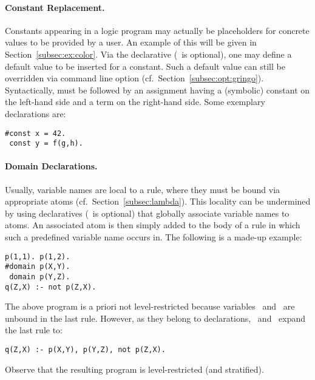 \paragraph{Constant Replacement.}
Constants appearing in a logic program may actually be placeholders for
concrete values to be provided by a user.
An example of this will be given in Section~\ref{subsec:ex:color}.
Via the  declarative (\code{\#}~is optional),
one may define a default value to be inserted for a constant.
Such a default value can still be overridden via command line option
 (cf.\ Section~\ref{subsec:opt:gringo}).
Syntactically,  must be followed by an assignment having
a (symbolic) constant on the left-hand side and a term on the right-hand side.
Some exemplary  declarations are:
%
\begin{lstlisting}[numbers=none]
#const x = 42.
 const y = f(g,h).
\end{lstlisting}

\paragraph{Domain Declarations.}
Usually, variable names are local to a rule,
where they must be bound via appropriate atoms (cf.\ Section~\ref{subsec:lambda}).
This locality can be undermined by using
 declaratives (\code{\#}~is optional)
that globally associate variable names to atoms.
An associated atom is then simply added to the body of a rule in which
such a predefined variable name occurs in.
The following is a made-up example:
%
\begin{lstlisting}[numbers=none]
p(1,1). p(1,2).
#domain p(X,Y).
 domain p(Y,Z).
q(Z,X) :- not p(Z,X).
\end{lstlisting}
%
The above program is a priori not level-restricted because
variables~ and~ are unbound in the last rule.
However, as they belong to  declarations,
\gringo\ and \clingo\ expand the last rule to:
%
\begin{lstlisting}[numbers=none]
q(Z,X) :- p(X,Y), p(Y,Z), not p(Z,X).
\end{lstlisting}
%
Observe that the resulting program is level-restricted (and stratified).

